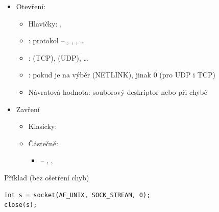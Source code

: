 \begin{frame}[fragile]{}

  \begin{itemize}
    \item Otevření: 
    \begin{itemize}
      \item Hlavičky: , 
      \item {}: protokol -- , ,
	, \dots
      \item {}:  (TCP),  (UDP), \dots
      \item {}: pokud je na výběr (NETLINK), jinak 0 (pro UDP i TCP)
      \item Návratová hodnota: souborový deskriptor nebo  při chybě
    \end{itemize}

    \pause

    \item Zavření
    \begin{itemize}
      \item Klasicky: 
\ifpcdirlinuxb
      \item Částečně: 
      \begin{itemize}
	\item {} -- , , 
      \end{itemize}
\fi
    \end{itemize}

    \pause
  \end{itemize}


  \begin{block}{Příklad (bez ošetření chyb)}
  \begin{lstlisting}
int s = socket(AF_UNIX, SOCK_STREAM, 0);
close(s);
  \end{lstlisting}
  \end{block}

\end{frame}
